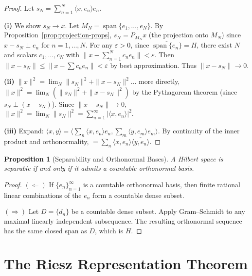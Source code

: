 \documentclass[11pt,a4paper]{article}
\theoremstyle{definition}
\theoremstyle{plain}
\newtheorem{proposition}[theorem]{Proposition}
\theoremstyle{remark}
\DeclareMathOperator{\spn}{span}
\begin{document}
\begin{proof}
Let $s_N = \sum_{n=1}^N \langle x, e_n \rangle e_n$.

\textbf{(i)} We show $s_N \to x$. Let $M_N = \spn\{e_1, \ldots, e_N\}$.
By Proposition~\ref{prop:projection-props}, $s_N = P_{M_N} x$ (the projection
onto $M_N$) since $x - s_N \perp e_n$ for $n = 1, \ldots, N$.
For any $\varepsilon > 0$, since $\overline{\spn\{e_n\}} = H$, there exist
$N$ and scalars $c_1, \ldots, c_N$ with $\|x - \sum_{n=1}^N c_n e_n\| < \varepsilon$.
Then $\|x - s_N\| \leq \|x - \sum c_n e_n\| < \varepsilon$ by best
approximation. Thus $\|x - s_N\| \to 0$.

\textbf{(ii)} $\|x\|^2 = \lim_N \|s_N\|^2 + \|x - s_N\|^2$... more directly,
$\|x\|^2 = \lim_N (\|s_N\|^2 + \|x - s_N\|^2)$ by the Pythagorean theorem
(since $s_N \perp (x - s_N)$). Since $\|x - s_N\| \to 0$,
$\|x\|^2 = \lim_N \|s_N\|^2 = \sum_{n=1}^\infty |\langle x, e_n \rangle|^2$.

\textbf{(iii)} Expand:
$\langle x, y \rangle = \langle \sum_n \langle x, e_n \rangle e_n,
\sum_m \langle y, e_m \rangle e_m \rangle$. By continuity of the inner
product and orthonormality,
$= \sum_n \langle x, e_n \rangle \overline{\langle y, e_n \rangle}$.
\end{proof}

\begin{proposition}[Separability and Orthonormal Bases]\label{prop:separability}
A Hilbert space is separable if and only if it admits a countable orthonormal
basis.
\end{proposition}

\begin{proof}
$(\Leftarrow)$ If $\{e_n\}_{n=1}^\infty$ is a countable orthonormal basis,
then finite rational linear combinations of the $e_n$ form a countable
dense subset.

$(\Rightarrow)$ Let $D = \{d_n\}$ be a countable dense subset. Apply
Gram--Schmidt to any maximal linearly independent subsequence. The resulting
orthonormal sequence has the same closed span as $D$, which is $H$.
\end{proof}


\section{The Riesz Representation Theorem}\label{sec:riesz}
\end{document}
